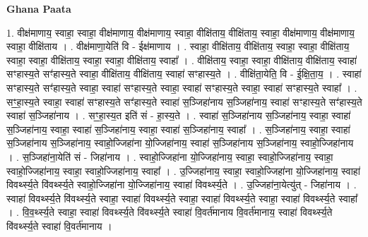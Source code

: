 \documentclass[17pt]{extarticle}
\begin{document}
\textbf{Ghana Paata } \newline

1. वीक्ष॑माणाय॒ स्वाहा॒ स्वाहा॒ वीक्ष॑माणाय॒ वीक्ष॑माणाय॒ स्वाहा॒ वीक्षि॑ताय॒ वीक्षि॑ताय॒ स्वाहा॒ वीक्ष॑माणाय॒ वीक्ष॑माणाय॒ स्वाहा॒ वीक्षि॑ताय । . वीक्ष॑माणा॒येति॑ वि - ईक्ष॑माणाय । . स्वाहा॒ वीक्षि॑ताय॒ वीक्षि॑ताय॒ स्वाहा॒ स्वाहा॒ वीक्षि॑ताय॒ स्वाहा॒ स्वाहा॒ वीक्षि॑ताय॒ स्वाहा॒ स्वाहा॒ वीक्षि॑ताय॒ स्वाहा᳚ । . वीक्षि॑ताय॒ स्वाहा॒ स्वाहा॒ वीक्षि॑ताय॒ वीक्षि॑ताय॒ स्वाहा॑ सꣳहास्य॒ते सꣳ॑हास्य॒ते स्वाहा॒ वीक्षि॑ताय॒ वीक्षि॑ताय॒ स्वाहा॑ सꣳहास्य॒ते । . वीक्षि॑ता॒येति॒ वि - ई॒क्षि॒ता॒य॒ । . स्वाहा॑ सꣳहास्य॒ते सꣳ॑हास्य॒ते स्वाहा॒ स्वाहा॑ सꣳहास्य॒ते स्वाहा॒ स्वाहा॑ सꣳहास्य॒ते स्वाहा॒ स्वाहा॑ सꣳहास्य॒ते स्वाहा᳚ । . सꣳ॒॒हा॒स्य॒ते स्वाहा॒ स्वाहा॑ सꣳहास्य॒ते सꣳ॑हास्य॒ते स्वाहा॑ स॒ञ्जिहा॑नाय स॒ञ्जिहा॑नाय॒ स्वाहा॑ सꣳहास्य॒ते सꣳ॑हास्य॒ते स्वाहा॑ स॒ञ्जिहा॑नाय । . सꣳ॒॒हा॒स्य॒त इति॑ सं - हा॒स्य॒ते । . स्वाहा॑ स॒ञ्जिहा॑नाय स॒ञ्जिहा॑नाय॒ स्वाहा॒ स्वाहा॑ स॒ञ्जिहा॑नाय॒ स्वाहा॒ स्वाहा॑ स॒ञ्जिहा॑नाय॒ स्वाहा॒ स्वाहा॑ स॒ञ्जिहा॑नाय॒ स्वाहा᳚ । . स॒ञ्जिहा॑नाय॒ स्वाहा॒ स्वाहा॑ स॒ञ्जिहा॑नाय स॒ञ्जिहा॑नाय॒ स्वाहो॒ज्जिहा॑ना यो॒ज्जिहा॑नाय॒ स्वाहा॑ स॒ञ्जिहा॑नाय स॒ञ्जिहा॑नाय॒ स्वाहो॒ज्जिहा॑नाय । . स॒ञ्जिहा॑ना॒येति॑ सं - जिहा॑नाय । . स्वाहो॒ज्जिहा॑ना यो॒ज्जिहा॑नाय॒ स्वाहा॒ स्वाहो॒ज्जिहा॑नाय॒ स्वाहा॒ स्वाहो॒ज्जिहा॑नाय॒ स्वाहा॒ स्वाहो॒ज्जिहा॑नाय॒ स्वाहा᳚ । . उ॒ज्जिहा॑नाय॒ स्वाहा॒ स्वाहो॒ज्जिहा॑ना यो॒ज्जिहा॑नाय॒ स्वाहा॑ विवर्थ्स्य॒ते वि॑वर्थ्स्य॒ते स्वाहो॒ज्जिहा॑ना यो॒ज्जिहा॑नाय॒ स्वाहा॑ विवर्थ्स्य॒ते । . उ॒ज्जिहा॑ना॒येत्यु॑त् - जिहा॑नाय । . स्वाहा॑ विवर्थ्स्य॒ते वि॑वर्थ्स्य॒ते स्वाहा॒ स्वाहा॑ विवर्थ्स्य॒ते स्वाहा॒ स्वाहा॑ विवर्थ्स्य॒ते स्वाहा॒ स्वाहा॑ विवर्थ्स्य॒ते स्वाहा᳚ । . वि॒व॒र्थ्स्य॒ते स्वाहा॒ स्वाहा॑ विवर्थ्स्य॒ते वि॑वर्थ्स्य॒ते स्वाहा॑ वि॒वर्त॑मानाय वि॒वर्त॑मानाय॒ स्वाहा॑ विवर्थ्स्य॒ते वि॑वर्थ्स्य॒ते स्वाहा॑ वि॒वर्त॑मानाय । \newline
\end{document}
